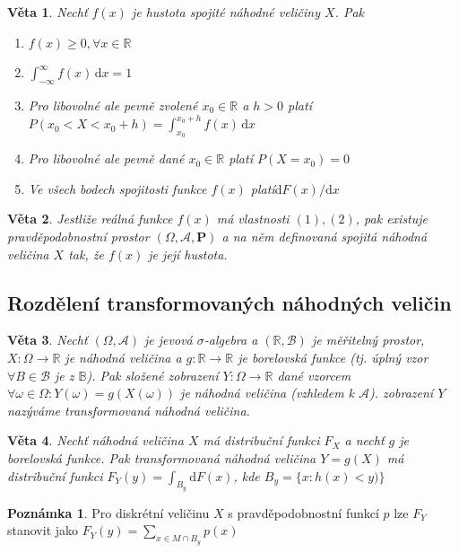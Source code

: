 \documentclass[a4]{report}
\newtheorem{theorem}{Věta}
\theoremstyle{definition}
\newtheorem{notes}{Poznámka}[section]
\begin{document}
{\begin{theorem}
Nechť $f(x)$ je hustota spojité náhodné veličiny $X$. Pak 
\begin{enumerate}
\item $f(x)\geq 0, \forall x \in \mathbb{R}$
\item $\int_{-\infty}^{\infty} f(x)\, \mathrm{d} x=1$
\item Pro libovolné ale pevně zvolené $x_0\in \mathbb{R}$ a $h>0 $ platí $P(x_0<X<x_0+h)=\int_{x_0}^{x_0+h}f(x)\, \mathrm{d}x$
\item Pro libovolné ale pevně dané $x_0\in \mathbb{R}$ platí $P(X=x_0)=0$
\item Ve všech bodech spojitosti funkce $f(x)$ platí$ \mathrm{d}F(x)/\mathrm{d}x$
\end{enumerate}
\end{theorem}

\begin{theorem}
Jestliže reálná funkce $f(x)$ má vlastnosti $(1),(2)$, pak existuje pravděpodobnostní prostor $(\Omega,\mathcal{A},\textbf{P})$ a na něm definovaná spojitá náhodná veličina $X$ tak, že $f(x)$ je její hustota.
\end{theorem}

\subsection{Rozdělení transformovaných náhodných veličin}
\begin{theorem}
Nechť $(\Omega, \mathcal{A})$ je jevová $\sigma$-algebra a $(\mathbb{R},\mathcal{B})$ je měřitelný prostor, $X:\Omega\rightarrow \mathbb{R}$ je náhodná veličina a $g:\mathbb{R}\rightarrow\mathbb{R}$ je borelovská funkce (tj. úplný vzor $\forall B \in \mathcal{B}$ je z $\mathbb{B}$). Pak složené zobrazení $Y:\Omega\rightarrow \mathbb{R}$ dané vzorcem $\forall \omega \in \Omega: Y(\omega)=g(X(\omega))$ je náhodná veličina (vzhledem k $\mathcal{A}$). zobrazení $Y$ nazýváme transformovaná náhodná veličina.
 \end{theorem}
 
 \begin{theorem}
 Nechť náhodná veličina $X$ má distribuční funkci $F_X$ a nechť $g$ je borelovská funkce. Pak transformovaná náhodná veličina $Y=g(X)$ má distribuční funkci $F_Y(y)=\int_{B_y}\mathrm{d}F(x)$, kde $B_y=\{x:h(x)<y) \}$
 \end{theorem}

\begin{notes}
Pro diskrétní veličinu $X$ s pravděpodobnostní funkcí $p$ lze $F_Y$ stanovit jako $F_Y(y)=\sum_{x\in M\cap B_y}p(x)$
\end{notes}

}
\end{document}
